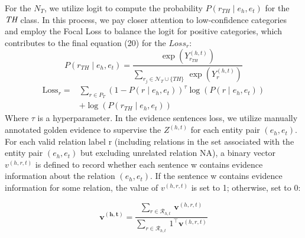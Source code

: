 \documentclass[preprint,12pt]{elsarticle}
\begin{document}
For the  $N_T$,  we utilize  logit to compute the probability $P\left( {r_{TH} \mid e_{h},e_{t}} \right)$ for the $\emph{TH}$ class. In this process, we pay closer attention to low-confidence categories and employ the Focal Loss to balance the logit for positive categories, which contributes to the final equation (20) for the $Loss_r$:
\begin{equation}
P\left( {r_{TH} \mid e_{h},e_{t}} \right) = \frac{\exp\left( Y_{r_{TH}}^{({h,t})} \right)}{\sum_{r_{j} \in \mathcal{N}_{T} \cup \{ TH\}}\,{\exp\left( Y_{r}^{({h,t})} \right)}}
\label{eq20}
\end{equation}
\begin{equation}
\begin{aligned}
\text{Loss}_{r} = & \sum\limits_{r \in P_{T}} \left(1 - P\left(r \mid e_{h},e_{t}\right)\right)^{\tau} \log\left(P\left(r \mid e_{h},e_{t}\right)\right) \\
& + {\log\left( {P\left( {r_{TH} \mid e_{h},e_{t}} \right)} \right)}
\end{aligned}
\label{eq21}
\end{equation}
Where $\tau$ is a hyperparameter. In the evidence sentences loss, we utilize manually annotated golden evidence to supervise the  $Z^{(h,t)}$ for each entity pair $(e_h,e_t)$. For each valid relation label r (including relations in the set associated with the entity pair $(e_h,e_t)$ but excluding unrelated relation NA), a binary vector $v^{(h,r,t)}$ is defined to record whether each sentence w contains evidence information about the relation $(e_h,e_t)$. If the sentence w contains evidence information for some relation, the value of  $v^{(h,r,t)}$ is set to 1; otherwise, set to 0:

\begin{equation}
\mathbf{v}^{(\mathbf{h},\mathbf{t})} = \frac{\sum_{r \in \mathcal{R}_{h,t}}\,\mathbf{v}^{({h,r,t})}}{\sum_{r \in \mathcal{R}_{h,t}}\,1^{\top}\mathbf{v}^{({h,r,t})}}
\label{eq22}
\end{equation}
\end{document}
